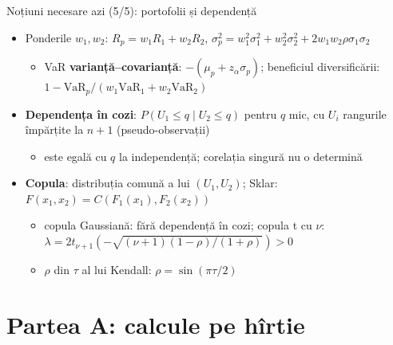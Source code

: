 \begin{frame}{Noțiuni necesare azi (5/5): portofolii și dependență}
\itemsize{\small}
\begin{itemize}
    \item Ponderile $w_1, w_2$: $R_p = w_1R_1 + w_2R_2$, $\sigma_p^2 = w_1^2\sigma_1^2 + w_2^2\sigma_2^2 + 2w_1w_2\rho\sigma_1\sigma_2$
    \begin{itemize}
        \item VaR \textbf{varianță--covarianță}: $-(\mu_p + z_\alpha\sigma_p)$; beneficiul diversificării: $1 - \mathrm{VaR}_p/(w_1\mathrm{VaR}_1 + w_2\mathrm{VaR}_2)$
    \end{itemize}
    \item \textbf{Dependența în cozi}: $P(U_1 \le q \mid U_2 \le q)$ pentru $q$ mic, cu $U_i$ rangurile împărțite la $n + 1$ (pseudo-observații)
    \begin{itemize}
        \item este egală cu $q$ la independență; corelația singură nu o determină
    \end{itemize}
    \item \textbf{Copula}: distribuția comună a lui $(U_1, U_2)$; Sklar: $F(x_1, x_2) = C(F_1(x_1), F_2(x_2))$
    \begin{itemize}
        \item copula Gaussiană: fără dependență în cozi; copula t cu $\nu$: $\lambda = 2t_{\nu+1}(-\sqrt{(\nu + 1)(1 - \rho)/(1 + \rho)}) > 0$ 
        \item $\rho$ din $\tau$ al lui Kendall: $\rho = \sin(\pi\tau/2)$
    \end{itemize}
\end{itemize}
\end{frame}


\section{Partea A: calcule pe hîrtie}

